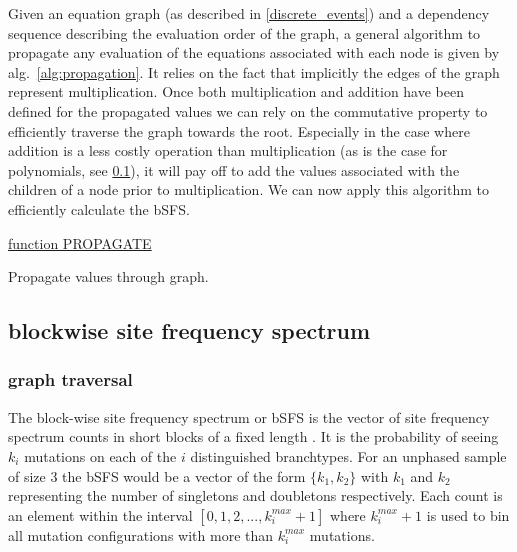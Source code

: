 \documentclass[10pt, a4]{article}
\begin{document}
Given an equation graph (as described in \ref{discrete_events}) and a dependency sequence describing the evaluation order of the graph, a general algorithm to propagate any evaluation of the equations associated with each node is given by alg.\ \ref{alg:propagation}. It relies on the fact that implicitly the edges of the graph represent multiplication. Once both multiplication and addition have been defined for the propagated values we can rely on the commutative property to efficiently traverse the graph towards the root. Especially in the case where addition is a less costly operation than multiplication (as is the case for polynomials, see \ref{bsfs}), it will pay off to add the values associated with the children of a node prior to multiplication. We can now apply this algorithm to efficiently calculate the bSFS. 

\begin{algorithm}\label{alg:propagation}
	
    \underline{function PROPAGATE}\;
    

    \caption{Propagate values through graph.}
\end{algorithm}

\subsection{blockwise site frequency spectrum} \label{bsfs}

\subsubsection{graph traversal}
The block-wise site frequency spectrum or bSFS is the vector of site frequency spectrum counts in short blocks of a fixed length \citep{Bunnefeld2015}. It is the probability of seeing $k_i$ mutations on each of the $i$ distinguished branchtypes. For an unphased sample of size 3 the bSFS would be a vector of the form $\{k_1, k_2\}$ with $k_1$ and $k_2$ representing the number of singletons and doubletons respectively. Each count is an element within the interval $[0, 1, 2, ... , k_i^{max} + 1]$ where $k_i^{max} + 1$ is used to bin all mutation configurations with more than $k_i^{max}$ mutations. 
\end{document}
